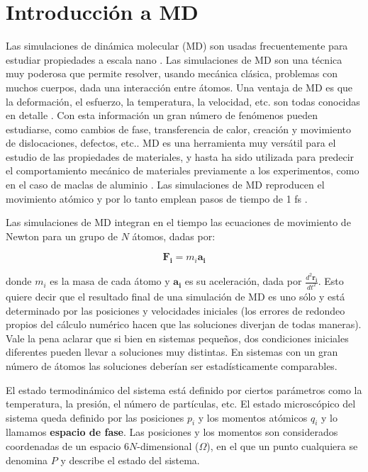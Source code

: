 \section{Introducción a MD}
\label{S2_2}

Las simulaciones de dinámica molecular (MD) son usadas frecuentemente para estudiar propiedades a escala nano \cite{allen87}. Las simulaciones de MD son una técnica muy poderosa que permite resolver, usando mecánica clásica, problemas con muchos cuerpos, dada una interacción entre átomos. Una ventaja de MD es que la deformación, el esfuerzo, la temperatura, la velocidad, etc. son todas conocidas en detalle \cite{allen87}. Con esta información un gran número de fenómenos pueden estudiarse, como cambios de fase, transferencia de calor, creación y movimiento de dislocaciones, defectos, etc.. MD es una herramienta muy versátil para el estudio de las propiedades de materiales, y hasta ha sido utilizada para predecir el comportamiento mecánico de materiales previamente a los experimentos, como en el caso de maclas de aluminio \cite{chen03}. Las simulaciones de MD reproducen el movimiento atómico y por lo tanto emplean pasos de tiempo de 1 fs \cite{allen87}.

Las simulaciones de MD integran en el tiempo las ecuaciones de movimiento de Newton para un grupo de $N$ átomos, dadas por:

\begin{equation}
\mathbf{F_{i}} = m_{i}\mathbf{a_{i}}
\end{equation}

donde $m_{i}$ es la masa de cada átomo y $\mathbf{a_{i}}$ es su aceleración, dada por $\frac{d^{2}\mathbf{r_{i}}}{dt^{2}}$. Esto quiere decir que el resultado final de una simulación de MD es uno sólo y está determinado por las posiciones y velocidades iniciales (los errores de redondeo propios del cálculo numérico hacen que las soluciones diverjan de todas maneras). Vale la pena aclarar que si bien en sistemas pequeños, dos condiciones iniciales diferentes pueden llevar a soluciones muy distintas. En sistemas con un gran número de átomos las soluciones deberían ser estadísticamente comparables.

El estado termodinámico del sistema está definido por ciertos parámetros como la temperatura, la presión, el número de partículas, etc. El estado microscópico del sistema queda definido por las posiciones $p_{i}$ y los momentos atómicos $q_{i}$ y lo llamamos \textbf{espacio de fase}. Las posiciones y los momentos son considerados coordenadas de un espacio $6N$-dimensional ($\Omega$), en el que un punto cualquiera se denomina $P$ y describe el estado del sistema. 


